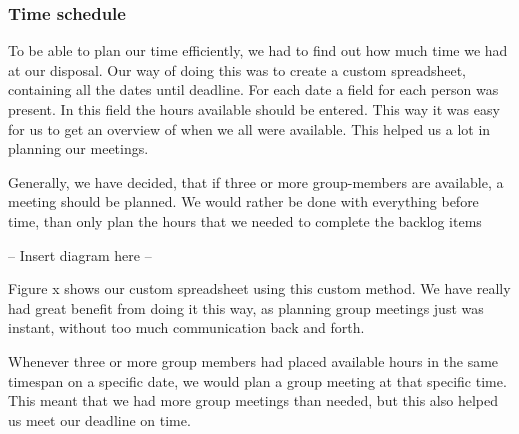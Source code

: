 \subsubsection{Time schedule}
To be able to plan our time efficiently, we had to find out how much time we had at our disposal. Our way of doing this was to create a custom spreadsheet, containing all the dates until deadline. For each date a field for each person was present. In this field the hours available should be entered. This way it was easy for us to get an overview of when we all were available. This helped us a lot in planning our meetings.

Generally, we have decided, that if three or more group-members are available, a meeting should be planned. We would rather be done with everything before time, than only plan the hours that we needed to complete the backlog items

-- Insert diagram here --

Figure x shows our custom spreadsheet using this custom method. We have really had great benefit from doing it this way, as planning group meetings just was instant, without too much communication back and forth.

Whenever three or more group members had placed available hours in the same timespan on a specific date, we would plan a group meeting at that specific time. This meant that we had more group meetings than needed, but this also helped us meet our deadline on time.